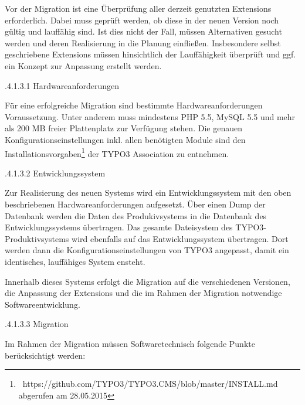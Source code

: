 \documentclass[a4paper]{article}
\begin{document}
\bigskip

{\sffamily
Vor der Migration ist eine Überprüfung aller derzeit genutzten Extensions erforderlich. Dabei muss geprüft werden, ob
diese in der neuen Version noch gültig und lauffähig sind. Ist dies nicht der Fall, müssen Alternativen gesucht werden
und deren Realisierung in die Planung einfließen. Insbesondere selbst geschriebene Extensions müssen hinsichtlich der
Lauffähigkeit überprüft und ggf. ein Konzept zur Anpassung erstellt werden.}


\bigskip

{.4.1.3.1 Hardwareanforderungen}


\bigskip

{\sffamily
Für eine erfolgreiche Migration sind bestimmte Hardwareanforderungen Voraussetzung. Unter anderem muss mindestens PHP
5.5, MySQL 5.5 und mehr als 200 MB freier Plattenplatz zur Verfügung stehen. Die genauen Konfigurationseinstellungen
inkl. allen benötigten Module sind den
Installationsvorgaben\footnote{\ https://github.com/TYPO3/TYPO3.CMS/blob/master/INSTALL.md abgerufen am 28.05.2015} der
TYPO3 Association zu entnehmen.}


\bigskip

{.4.1.3.2 Entwicklungssystem}


\bigskip

{\sffamily
Zur Realisierung des neuen Systems wird ein Entwicklungssystem mit den oben beschriebenen Hardwareanforderungen
aufgesetzt. Über einen Dump der Datenbank werden die Daten des Produkivsystems in die Datenbank des Entwicklungssystems
übertragen. Das gesamte Dateisystem des TYPO3-Produktivsystems wird ebenfalls auf das Entwicklungssystem übertragen.
Dort werden dann die Konfigurationseinstellungen von TYPO3 angepasst, damit ein identisches, lauffähiges System
ensteht.}


\bigskip

{\sffamily
Innerhalb dieses Systems erfolgt die Migration auf die verschiedenen Versionen, die Anpassung der Extensions und die im
Rahmen der Migration notwendige Softwareentwicklung.}


\bigskip

{.4.1.3.3 Migration}


\bigskip

{\sffamily
Im Rahmen der Migration müssen Softwaretechnisch folgende Punkte berücksichtigt werden:}


\bigskip
\end{document}
